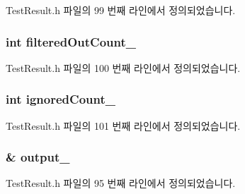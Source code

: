 Test\+Result.\+h 파일의 99 번째 라인에서 정의되었습니다.

\subsubsection[{\texorpdfstring{filtered\+Out\+Count\+\_\+}{filteredOutCount_}}]{\setlength{\rightskip}{0pt plus 5cm}int filtered\+Out\+Count\+\_\+\hspace{0.3cm}{\ttfamily [private]}}\hypertarget{class_test_result_a248db91e883a63c01979bd4061c9d09a}{}\label{class_test_result_a248db91e883a63c01979bd4061c9d09a}


Test\+Result.\+h 파일의 100 번째 라인에서 정의되었습니다.

\subsubsection[{\texorpdfstring{ignored\+Count\+\_\+}{ignoredCount_}}]{\setlength{\rightskip}{0pt plus 5cm}int ignored\+Count\+\_\+\hspace{0.3cm}{\ttfamily [private]}}\hypertarget{class_test_result_a2b7730405ef24d65a7aa54d40213e28f}{}\label{class_test_result_a2b7730405ef24d65a7aa54d40213e28f}


Test\+Result.\+h 파일의 101 번째 라인에서 정의되었습니다.

\subsubsection[{\texorpdfstring{output\+\_\+}{output_}}]{\& output\+\_\+\hspace{0.3cm}{\ttfamily [private]}}\hypertarget{class_test_result_ac3a8d866a9a5666377f4b37771255ff1}{}\label{class_test_result_ac3a8d866a9a5666377f4b37771255ff1}


Test\+Result.\+h 파일의 95 번째 라인에서 정의되었습니다.


